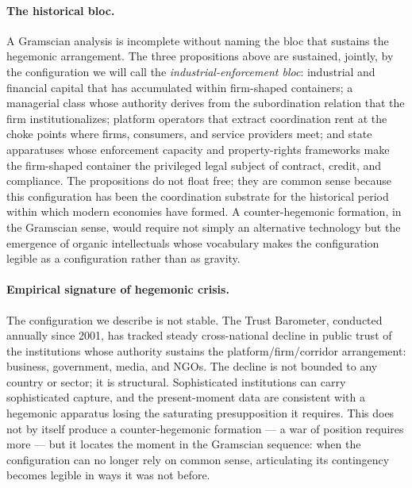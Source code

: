 \documentclass[11pt,a4paper]{article}
\theoremstyle{remark}
\begin{document}
\paragraph{The historical bloc.}
A Gramscian analysis is incomplete without naming the bloc that
sustains the hegemonic arrangement. The three propositions above
are sustained, jointly, by the configuration we will call the
\emph{industrial-enforcement bloc}: industrial and financial
capital that has accumulated within firm-shaped containers;
a managerial class whose authority derives from the subordination
relation that the firm institutionalizes; platform operators that
extract coordination rent at the choke points where firms,
consumers, and service providers meet; and state apparatuses whose
enforcement capacity and property-rights frameworks make the
firm-shaped container the privileged legal subject of contract,
credit, and compliance. The propositions do not float free; they
are common sense because this configuration has been the
coordination substrate for the historical period within which
modern economies have formed. A counter-hegemonic formation, in
the Gramscian sense, would require not simply an alternative
technology but the emergence of organic intellectuals whose
vocabulary makes the configuration legible as a configuration
rather than as gravity.

\paragraph{Empirical signature of hegemonic crisis.}
The configuration we describe is not stable. The
\citet{edelman2026trust} Trust Barometer, conducted annually since
2001, has tracked steady cross-national decline in public trust of
the institutions whose authority sustains the
platform/firm/corridor arrangement: business, government, media,
and NGOs. The decline is not bounded to any country or sector; it
is structural. Sophisticated institutions can carry sophisticated
capture, and the present-moment data are consistent with a
hegemonic apparatus losing the saturating presupposition it
requires. This does not by itself produce a counter-hegemonic
formation --- a war of position requires more --- but it locates
the moment in the Gramscian sequence: when the configuration can
no longer rely on common sense, articulating its contingency
becomes legible in ways it was not before.
\end{document}
